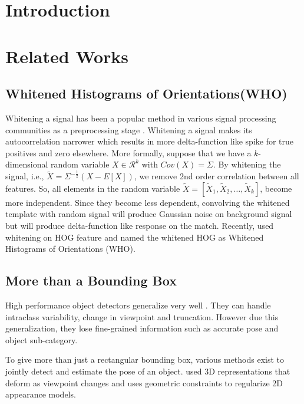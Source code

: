 \documentclass[10pt,twocolumn,letterpaper]{article}
\begin{document}
\section{Introduction}
\label{sec:intro}


\section{Related Works}
\subsection{Whitened Histograms of Orientations(WHO)}
Whitening a signal has been a popular method in various signal processing communities as a preprocessing stage \cite{Martinsson05, Belouchrani00}. Whitening a signal makes its autocorrelation narrower which results in more delta-function like spike for true positives and zero elsewhere. More formally, suppose that we have a $k$-dimensional random variable $X \in \mathcal{R}^k$ with $Cov(X)=\Sigma$. By whitening the signal, i.e., $\tilde{X}=\Sigma^{-\frac{1}{2}}(X - E[X])$, we remove 2nd order correlation between all features. So, all elements in the random variable $\tilde{X} = \left[\tilde{X}_1, \tilde{X}_2, \dots, \tilde{X}_k\right]$, become more independent. Since they become less dependent, convolving the whitened template with random signal will produce Gaussian noise on background signal but will produce delta-function like response on the match. Recently, \cite{Hariharan12} used whitening on HOG feature and named the whitened HOG as Whitened Histograms of Orientations (WHO).


\subsection{More than a Bounding Box}

High performance object detectors generalize very well \cite{Felzenszwalb10, Girshick14}. They can handle intraclass variability, change in viewpoint and truncation. However due this generalization, they lose fine-grained information such as accurate pose and object sub-category. 

To give more than just a rectangular bounding box, \cite{Pepik12, Xiang12, Fidler12, Xiang14, Hejrati14, Aubry14, Lim14} various methods exist to jointly detect and estimate the pose of an object. \cite{Xiang12, Hejrati14, Fidler12} used 3D representations that deform as viewpoint changes and \cite{Pepik12} uses geometric constraints to regularize 2D appearance models. 
\end{document}
